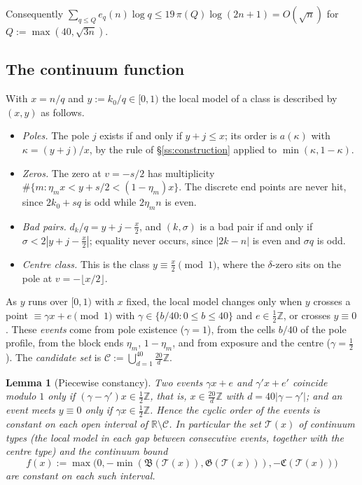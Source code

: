 \documentclass{amsart}
\newtheorem{lemma}[theorem]{Lemma}
\theoremstyle{definition}
\theoremstyle{remark}
\numberwithin{equation}{section}
\newcommand{\Z}{\mathbb{Z}}
\newcommand{\R}{\mathbb{R}}
\begin{document}
Consequently $\sum_{q\le Q}e_q(n)\log q\le19\,\pi(Q)\log(2n+1)=O(\sqrt n)$
for $Q:=\max(40,\sqrt{3n})$.

\subsection{The continuum function}\label{ss:continuum}

With $x=n/q$ and $y:=k_0/q\in[0,1)$ the local model of a class is described
by $(x,y)$ as follows.
\begin{itemize}
\item \emph{Poles.} The pole $j$ exists if and only if $y+j\le x$; its order
  is $a(\kappa)$ with $\kappa=(y+j)/x$, by the rule of \S\ref{ss:construction}
  applied to $\min(\kappa,1-\kappa)$.
\item \emph{Zeros.} The zero at $v=-s/2$ has multiplicity
  $\#\{m:\eta_mx<y+s/2<(1-\eta_m)x\}$. The discrete end points are never
  hit, since $2k_0+sq$ is odd while $2\eta_mn$ is even.
\item \emph{Bad pairs.} $d_k/q=y+j-\frac x2$, and $(k,\sigma)$ is a bad pair
  if and only if $\sigma<2|y+j-\frac x2|$; equality never occurs, since
  $|2k-n|$ is even and $\sigma q$ is odd.
\item \emph{Centre class.} This is the class $y\equiv\frac x2\pmod1$, where
  the $\delta$-zero sits on the pole at $v=-\lfloor x/2\rfloor$.
\end{itemize}
As $y$ runs over $[0,1)$ with $x$ fixed, the local model changes only when $y$
crosses a point $\equiv\gamma x+e\pmod1$ with $\gamma\in\{b/40:0\le b\le40\}$
and $e\in\frac12\Z$, or crosses $y\equiv0$. These \emph{events} come from pole
existence ($\gamma=1$), from the cells $b/40$ of the pole profile, from the
block ends $\eta_m$, $1-\eta_m$, and from exposure and the centre
($\gamma=\frac12$). The \emph{candidate set} is
$\mathcal C:=\bigcup_{d=1}^{40}\frac{20}d\Z$.

\begin{lemma}[Piecewise constancy]\label{lem:piecewise}
Two events $\gamma x+e$ and $\gamma'x+e'$ coincide modulo $1$ only if
$(\gamma-\gamma')x\in\frac12\Z$, that is, $x\in\frac{20}d\Z$ with
$d=40|\gamma-\gamma'|$; and an event meets $y\equiv0$ only if
$\gamma x\in\frac12\Z$. Hence the cyclic order of the events is constant on
each open interval of $\R\setminus\mathcal C$. In particular the set
$\mathcal T(x)$ of \emph{continuum types} (the local model in each gap
between consecutive events, together with the centre type) and the
\emph{continuum bound}
\[
  f(x):=\max\bigl(0,-\min(\mathfrak B(\mathcal T(x)),\mathfrak G(\mathcal T(x))),-\mathfrak C(\mathcal T(x))\bigr)
\]
are constant on each such interval.
\end{lemma}
\end{document}
